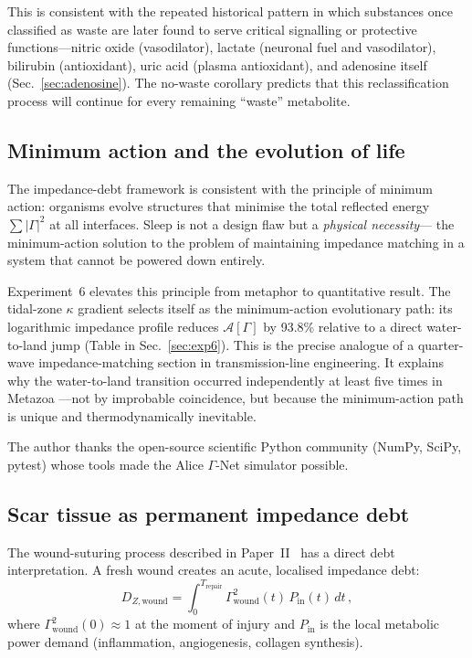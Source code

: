﻿\documentclass[aps,pre,twocolumn,superscriptaddress,floatfix]{revtex4-2}
\begin{document}
This is consistent with the repeated historical pattern
in which substances once classified as waste are later
found to serve critical signalling or protective
functions---nitric oxide (vasodilator), lactate
(neuronal fuel and vasodilator), bilirubin (antioxidant),
uric acid (plasma antioxidant), and adenosine itself
(Sec.~\ref{sec:adenosine}).
The no-waste corollary predicts that this reclassification
process will continue for every remaining ``waste'' metabolite.

\subsection{Minimum action and the evolution of life}

The impedance-debt framework is consistent with the
principle of minimum action:
organisms evolve structures that minimise the
total reflected energy $\sum |\Gamma|^2$
at all interfaces.
Sleep is not a design flaw but a \emph{physical necessity}---
the minimum-action solution to the problem of
maintaining impedance matching in a system that
cannot be powered down entirely.

Experiment~6 elevates this principle from metaphor to
quantitative result.
The tidal-zone $\kappa$ gradient selects itself
as the minimum-action evolutionary path:
its logarithmic impedance profile reduces
$\mathcal{A}[\Gamma]$ by 93.8\% relative to a direct
water-to-land jump (Table in Sec.~\ref{sec:exp6}).
This is the precise analogue of a quarter-wave
impedance-matching section in transmission-line engineering.
It explains why the water-to-land transition occurred
independently at least five times in Metazoa
---not by improbable coincidence,
but because the minimum-action path is unique
and thermodynamically inevitable.


\begin{acknowledgments}
The author thanks the open-source scientific Python community
(NumPy, SciPy, pytest) whose tools made the Alice $\Gamma$-Net
simulator possible.
\end{acknowledgments}

\subsection{Scar tissue as permanent impedance debt}
\label{sec:scar-debt}

The wound-suturing process described in
Paper~II~\cite{PaperII} has a direct debt interpretation.
A fresh wound creates an acute, localised impedance debt:
\begin{equation}
  D_{Z,\text{wound}} = \int_0^{T_{\text{repair}}}
    \Gamma_{\text{wound}}^2(t)\,P_{\text{in}}(t)\,dt\,,
  \label{eq:wound-debt}
\end{equation}
where $\Gamma_{\text{wound}}^2(0)\approx 1$ at the moment
of injury and $P_{\text{in}}$ is the local metabolic
power demand (inflammation, angiogenesis, collagen
synthesis).
\end{document}
